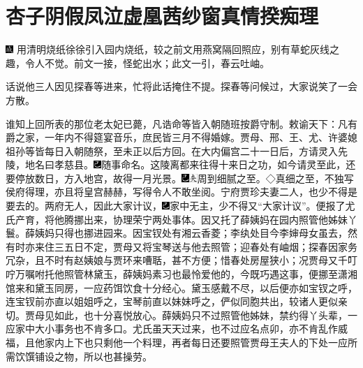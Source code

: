 

\chapter{杏子阴假凤泣虚凰\hspace{.5em}茜纱窗真情揆痴理}

{\includegraphics[width=3mm]{../Images/00005}  \kaishu 用清明烧纸徐徐引入园内烧纸，较之前文用燕窝隔回照应，别有草蛇灰线之趣，令人不觉。前文一接，怪蛇出水；此文一引，春云吐岫。}

话说他三人因见探春等进来，忙将此话掩住不提。探春等问候过，大家说笑了一会方散。

谁知上回所表的那位老太妃已薨，凡诰命等皆入朝随班按爵守制。敕谕天下：凡有爵之家，一年内不得筵宴音乐，庶民皆三月不得婚嫁。贾母、邢、王、尤、许婆媳祖孙等皆每日入朝随祭，至未正以后方回。在大内偏宫二十一日后，方请灵入先陵，地名曰孝慈县。{\includegraphics[width=3mm]{../Images/00003}随事命名。}这陵离都来往得十来日之功，如今请灵至此，还要停放数日，方入地宫，故得一月光景。{\includegraphics[width=3mm]{../Images/00003}\includegraphics[width=3mm]{../Images/00012}\footnotesize \kaishu 周到细腻之至。◇真细之至，不独写侯府得理，亦且将皇宫赫赫，写得令人不敢坐阅。}宁府贾珍夫妻二人，也少不得是要去的。两府无人，因此大家计议，{\includegraphics[width=3mm]{../Images/00003}家中无主，少不得又``大家计议''。}便报了尤氏产育，将他腾挪出来，协理荣宁两处事体。因又托了薛姨妈在园内照管他姊妹丫鬟。薛姨妈只得也挪进园来。因宝钗处有湘云香菱；李纨处目今李婶母女虽去，然有时亦来住三五日不定，贾母又将宝琴送与他去照管；迎春处有岫烟；探春因家务冗杂，且不时有赵姨娘与贾环来嘈聒，甚不方便；惜春处房屋狭小；况贾母又千叮咛万嘱咐托他照管林黛玉，薛姨妈素习也最怜爱他的，今既巧遇这事，便挪至潇湘馆来和黛玉同房，一应药饵饮食十分经心。黛玉感戴不尽，以后便亦如宝钗之呼，连宝钗前亦直以姐姐呼之，宝琴前直以妹妹呼之，俨似同胞共出，较诸人更似亲切。贾母见如此，也十分喜悦放心。薛姨妈只不过照管他姊妹，禁约得丫头辈，一应家中大小事务也不肯多口。尤氏虽天天过来，也不过应名点卯，亦不肯乱作威福，且他家内上下也只剩他一个料理，再者每日还要照管贾母王夫人的下处一应所需饮馔铺设之物，所以也甚操劳。

